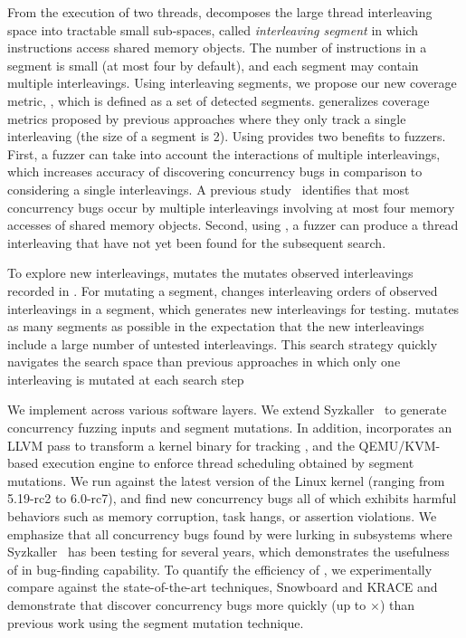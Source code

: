 From the execution of two threads,  
\sys decomposes the large thread interleaving space into tractable 
small sub-spaces, called \textit{interleaving segment} in which
instructions access shared memory objects. The number of instructions 
in a segment is small (at most four by default), and each segment may 
contain multiple interleavings. Using interleaving segments, we propose 
our new coverage metric, \textit{\intcov}, which is defined as a set of detected segments. \Intcov generalizes coverage 
metrics proposed by previous approaches where they only track 
a single interleaving (the size of a segment is 2). 
Using \intcov provides two benefits to fuzzers. First, a fuzzer can 
take into account the interactions of multiple interleavings, which increases
accuracy of discovering concurrency bugs in comparison to considering a single 
interleavings. A previous study~\cite{learningfrommistakes} identifies that
most concurrency bugs occur by multiple interleavings involving 
at most four memory accesses of shared memory objects.
Second, using \intcov, a fuzzer can produce a thread interleaving
that have not yet been found for the subsequent search.

%
To explore new interleavings,
\sys mutates the mutates observed interleavings recorded in \intcov. For mutating a segment, \sys changes interleaving orders of observed interleavings 
in a segment, which generates new interleavings for testing. \sys 
mutates as many segments as possible in the expectation that the 
new interleavings include a large number of untested interleavings. 
This search strategy quickly navigates the search space than previous 
approaches in which only one interleaving is mutated at each search step

We implement \sys across various software layers.
We extend Syzkaller~\cite{syzkaller} to generate concurrency fuzzing inputs 
and segment mutations. 
%
In addition, \sys incorporates an LLVM pass to transform a kernel
binary for tracking \intcov, and the QEMU/KVM-based execution engine
to enforce thread scheduling obtained by segment mutations. 
%
We run \sys against the latest version of the Linux kernel (ranging
from 5.19-rc2 to 6.0-rc7), and find new \totalbugs concurrency bugs all of
which exhibits harmful behaviors such as memory corruption,
task hangs, or assertion violations. We emphasize that all
concurrency bugs found by \sys were lurking in subsystems where
Syzkaller~\cite{syzkaller} has been testing for several years, which
demonstrates the usefulness of \sys in bug-finding capability.
%
To quantify the efficiency of \sys, we experimentally compare \sys 
against the state-of-the-art techniques, Snowboard and KRACE and 
demonstrate that \sys discover concurrency bugs more quickly 
(up to $\times$) than previous work using the segment mutation 
technique.

